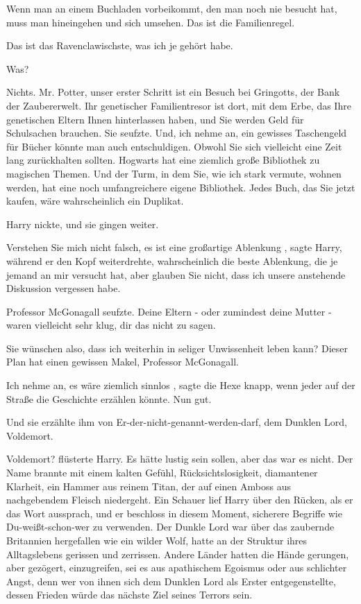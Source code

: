 \glqq Wenn man an einem Buchladen vorbeikommt, den man noch nie besucht hat, muss man hineingehen und sich
umsehen. Das ist die Familienregel.\grqq{}

\glqq Das ist das Ravenclawischste, was ich je gehört habe.\grqq{}

\glqq Was?\grqq{}

\glqq Nichts. Mr. Potter, unser erster Schritt ist ein Besuch bei Gringotts,
der Bank der Zaubererwelt. Ihr genetischer Familientresor ist dort, mit dem Erbe, das Ihre genetischen Eltern Ihnen
hinterlassen haben, und Sie werden Geld für Schulsachen brauchen.\grqq{}
Sie seufzte.
\glqq Und, ich nehme
an, ein gewisses Taschengeld für Bücher könnte man auch entschuldigen. Obwohl Sie sich vielleicht eine Zeit lang
zurückhalten sollten. Hogwarts hat eine ziemlich große Bibliothek zu magischen Themen. Und der Turm, in dem Sie, wie ich
stark vermute, wohnen werden, hat eine noch umfangreichere eigene Bibliothek. Jedes Buch, das Sie jetzt kaufen, wäre
wahrscheinlich ein Duplikat.\grqq{}

Harry nickte, und sie gingen weiter.

\glqq Verstehen Sie mich
nicht falsch, es ist eine großartige Ablenkung\grqq{} , sagte Harry, während er den Kopf weiterdrehte,
\glqq wahrscheinlich die beste Ablenkung, die je jemand an mir versucht hat, aber glauben Sie nicht, dass ich unsere
anstehende Diskussion vergessen habe.\grqq{}

Professor McGonagall seufzte. \glqq Deine Eltern - oder
zumindest deine Mutter - waren vielleicht sehr klug, dir das nicht zu sagen.\grqq{}

\glqq Sie wünschen also,
dass ich weiterhin in seliger Unwissenheit leben kann? Dieser Plan hat einen gewissen Makel, Professor McGonagall.\grqq{}

\glqq Ich nehme an, es wäre ziemlich sinnlos\grqq{} , sagte die Hexe knapp, \glqq wenn jeder auf der Straße
die Geschichte erzählen könnte. Nun gut.\grqq{}

Und sie erzählte ihm von Er-der-nicht-genannt-werden-darf,
dem Dunklen Lord, Voldemort.

\glqq Voldemort?\grqq{} flüsterte Harry. Es hätte lustig sein sollen, aber das
war es nicht. Der Name brannte mit einem kalten Gefühl, Rücksichtslosigkeit, diamantener Klarheit, ein Hammer aus reinem
Titan, der auf einen Amboss aus nachgebendem Fleisch niedergeht.
Ein Schauer lief Harry über den Rücken, als er
das Wort aussprach, und er beschloss in diesem Moment, sicherere Begriffe wie Du-weißt-schon-wer zu verwenden. Der
Dunkle Lord war über das zaubernde Britannien hergefallen wie ein wilder Wolf, hatte an der Struktur ihres Alltagslebens
gerissen und zerrissen.
Andere Länder hatten die Hände gerungen, aber gezögert, einzugreifen, sei es aus
apathischem Egoismus oder aus schlichter Angst, denn wer von ihnen sich dem Dunklen Lord als Erster entgegenstellte,
dessen Frieden würde das nächste Ziel seines Terrors sein.

